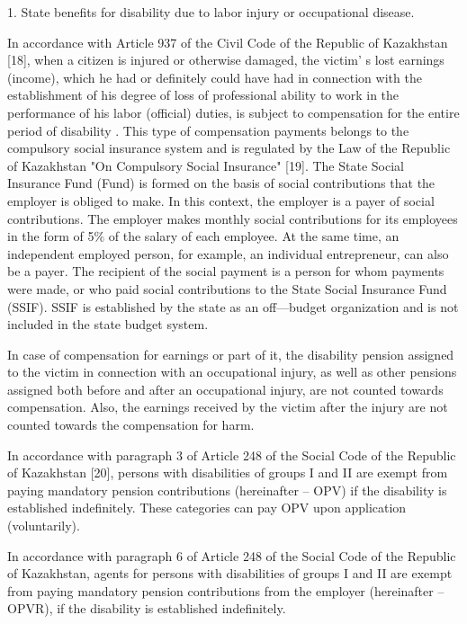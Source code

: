 \begin{multicols}{2}
1. State benefits for disability due to labor injury or occupational
disease.

In accordance with Article 937 of the Civil Code of the Republic of
Kazakhstan {[}18{]}, when a citizen is injured or otherwise damaged, the
victim' s lost earnings (income), which he had or
definitely could have had in connection with the establishment of his
degree of loss of professional ability to work in the performance of his
labor (official) duties, is subject to compensation for the entire
period of disability . This type of compensation payments belongs to the
compulsory social insurance system and is regulated by the Law of the
Republic of Kazakhstan "On Compulsory Social Insurance" {[}19{]}. The
State Social Insurance Fund (Fund) is formed on the basis of social
contributions that the employer is obliged to make. In this context, the
employer is a payer of social contributions. The employer makes monthly
social contributions for its employees in the form of 5\% of the salary
of each employee. At the same time, an independent employed person, for
example, an individual entrepreneur, can also be a payer. The recipient
of the social payment is a person for whom payments were made, or who
paid social contributions to the State Social Insurance Fund (SSIF).
SSIF is established by the state as an off---budget organization and is
not included in the state budget system.

In case of compensation for earnings or part of it, the disability
pension assigned to the victim in connection with an occupational
injury, as well as other pensions assigned both before and after an
occupational injury, are not counted towards compensation. Also, the
earnings received by the victim after the injury are not counted towards
the compensation for harm.

In accordance with paragraph 3 of Article 248 of the Social Code of the
Republic of Kazakhstan {[}20{]}, persons with disabilities of groups I
and II are exempt from paying mandatory pension contributions
(hereinafter -- OPV) if the disability is established indefinitely.
These categories can pay OPV upon application (voluntarily).

In accordance with paragraph 6 of Article 248 of the Social Code of the
Republic of Kazakhstan, agents for persons with disabilities of groups I
and II are exempt from paying mandatory pension contributions from the
employer (hereinafter -- OPVR), if the disability is established
indefinitely.


\end{multicols}
